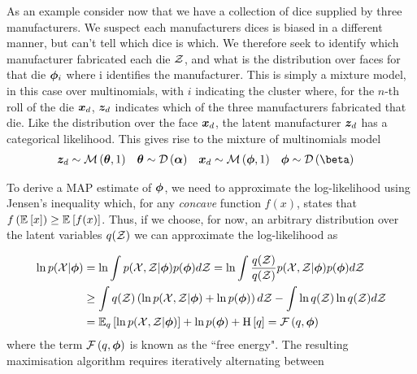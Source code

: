 As an example consider now that we have a collection of dice supplied by three manufacturers. We suspect each manufacturers dices is biased in a different manner, but can't tell which dice is which. We therefore seek to identify which manufacturer fabricated each die ${ \mathcal{Z} }$, and what is the distribution over faces for that die ${ \bm \phi }_i$ where i identifies the manufacturer. This is simply a mixture model, in this case over multinomials, with $i$ indicating the cluster where, for the $n$-th roll of the die $\bm x_d$, $\bm z_d$ indicates which of the three manufacturers fabricated that die. Like the distribution over the face $\bm x_d$, the latent manufacturer $\bm z_d$ has a categorical likelihood. This gives rise to the mixture of multinomials model\cite{Nigam2000}
\begin{align*}
\vv{z}_d & \sim \muln{\vv{\theta}}{1} & \vv{\theta} & \sim \dir{\vv{\alpha}} &
\vv{x}_d & \sim \muln{\param}{1} & \param & \sim \dir{\vv{\beta}}
\end{align*}

To derive a MAP estimate of ${ \bm \phi }$, we need to approximate the log-likelihood using Jensen's inequality which, for any \emph{concave} function $f(x)$, states that $f\left(\mathbb{E}_{ {  } }\left[ x \right]\right) \geq \mathbb{E}_{ {  } }\left[ f(x) \right]$. Thus, if we choose, for now, an arbitrary distribution over the latent variables $q({ \mathcal{Z} })$ we can approximate the log-likelihood as

\begin{align*}
\ln p({ \mathcal{X} }|{ \bm \phi }) & = \ln \int { p( { \mathcal{X} } ,  { \mathcal{Z} } |  {  \bm \phi  } ) } p({ \bm \phi }) d{ \mathcal{Z} } 
 = \ln \int \frac{q({ \mathcal{Z} })}{q({ \mathcal{Z} })} { p({ \mathcal{X} }, { \mathcal{Z} } | { \bm \phi }) } p({ \bm \phi }) d{ \mathcal{Z} } \\
& \geq \int  q({ \mathcal{Z} }) \left({ \ln { p( { \mathcal{X} } ,  { \mathcal{Z} } |  {  \bm \phi  } ) } } + \ln p({ \bm \phi })\right) d{ \mathcal{Z} }
  -     \int \ln q({ \mathcal{Z} }) \ln q({ \mathcal{Z} }) d{ \mathcal{Z} } \\
& = { \mathbb{E}_{ { {q} } }\left[ { \ln { p( { \mathcal{X} } ,  { \mathcal{Z} } |  {  \bm \phi  } ) } } \right] } + \ln p({ \bm \phi }) + \text{H} \left[ q \right] = { \mathcal{F}\left( {q, { \bm \phi }} \right) }
\end{align*}
where the term ${ \mathcal{F}\left( {q, { \bm \phi }} \right) }$ is known as the ``free energy". The resulting maximisation algorithm requires iteratively alternating between

